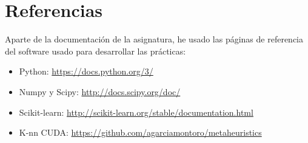 \newpage
\section{Referencias}
Aparte de la documentación de la asignatura, he usado las páginas de referencia del software usado para desarrollar las prácticas:
\begin{itemize}
\item Python:  \url{https://docs.python.org/3/}
\item Numpy y Scipy: \url{http://docs.scipy.org/doc/}
\item Scikit-learn: \url{http://scikit-learn.org/stable/documentation.html}
\item K-nn CUDA: \url{https://github.com/agarciamontoro/metaheuristics}
\end{itemize}
\newpage

